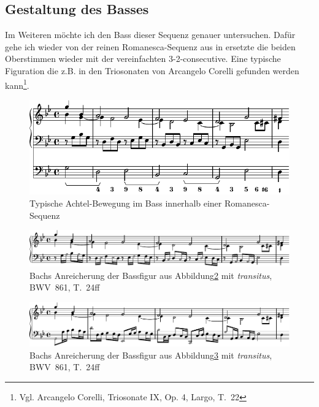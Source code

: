 

\subsection{Gestaltung des Basses}

Im Weiteren möchte ich den Bass dieser Sequenz genauer untersuchen.
Dafür gehe ich wieder von der reinen Romanesca-Sequenz aus in ersetzte die beiden Oberstimmen wieder mit der vereinfachten 3-2-consecutive.
Eine typische Figuration die z.B. in den Triosonaten von Arcangelo Corelli gefunden werden kann\footnote{Vgl. Arcangelo Corelli, Triosonate \textnumero IX, Op. 4, Largo, T.~22}.

\begin{figure}[htbp]
	\centering
	\includegraphics{lilypond/g-moll/render/romanesca-bass-bewegt}
	\caption{Typische Achtel-Bewegung im Bass innerhalb einer Romanesca-Sequenz}
	\label{fig:bwv681-bass-bewegt}
\end{figure}

\begin{figure}[htbp]
	\centering
	\includegraphics{lilypond/g-moll/render/romanesca-bass-transitus}
	\caption{Bachs Anreicherung der Bassfigur aus Abbildung\ref{fig:bwv681-bass-transitus} mit \emph{transitus}, BWV~861, T.~24ff}
	\label{fig:bwv681-bass-transitus}
\end{figure}



\begin{figure}[htbp]
	\centering
	\includegraphics{lilypond/g-moll/render/romanesca-bass-original}
	\caption{Bachs Anreicherung der Bassfigur aus Abbildung\ref{fig:bwv681-bass-original} mit \emph{transitus}, BWV~861, T.~24ff}
	\label{fig:bwv681-bass-original}
\end{figure}


